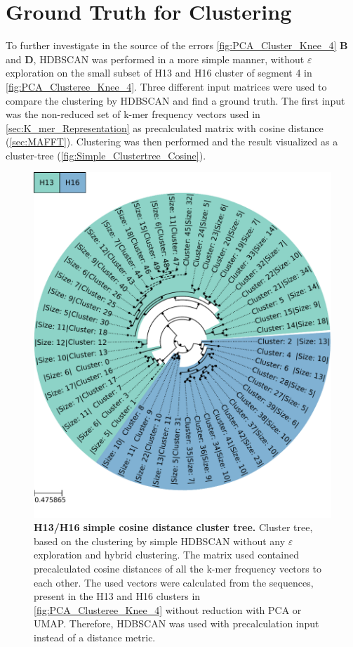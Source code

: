 \section{Ground Truth for Clustering} \label{sec:Comparison_Clustering}

To further investigate in the source of the errors \autoref{fig:PCA_Cluster_Knee_4} \textbf{\textsf{B}} and \textbf{\textsf{D}}, \gls{HDBSCAN} was performed in a more simple manner, without $\varepsilon$ exploration on the small subset of H13 and H16 cluster of segment 4 in \autoref{fig:PCA_Clusteree_Knee_4}. Three different input matrices were used to compare the clustering by \gls{HDBSCAN} and find a ground truth. The first input was the non-reduced set of k-mer frequency vectors used in \autoref{sec:K_mer_Representation} as precalculated matrix with cosine distance (\autoref{sec:MAFFT}). Clustering was then performed and the result visualized as a cluster-tree (\autoref{fig:Simple_Clustertree_Cosine}). 

\begin{figure}[!hbt]
    \centering
    \includegraphics[width=\textwidth]{PCA/Clustertree_Segment_4_H_Cosine.pdf}
    \caption[H13/H16 simple precalculated cosine distance cluster tree]{\textbf{H13/H16 simple cosine distance cluster tree.} Cluster tree, based on the clustering by simple \gls{HDBSCAN} without any $\varepsilon$ exploration and hybrid clustering. The matrix used contained precalculated cosine distances of all the k-mer frequency vectors to each other. The used vectors were calculated from the sequences, present in the H13 and H16 clusters in \autoref{fig:PCA_Clusteree_Knee_4} without reduction with \gls{PCA} or \gls{UMAP}. Therefore, \gls{HDBSCAN} was used with precalculation input instead of a distance metric.}
    \label{fig:Simple_Clustertree_Cosine}
\end{figure}

